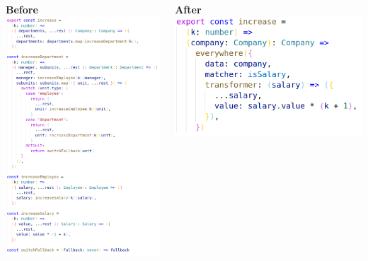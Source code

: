\documentclass[14pt]{beamer}
\begin{document}
\begin{frame}
  \begin{columns}
    \begin{column}{.5\textwidth}
      \vspace{1em}
      \textbf{Before}
      \includegraphics[height=0.7\textheight,width=\textwidth,keepaspectratio]{graphics/increase-naive-ts.png}
    \end{column}
    \begin{column}{.5\textwidth}
      \vspace{1em}
      \textbf{After}
      \includegraphics[height=0.7\textheight,width=\textwidth,keepaspectratio]{graphics/increase-ts.png}

\end{column}
\end{columns}
\end{frame}
\end{document}
